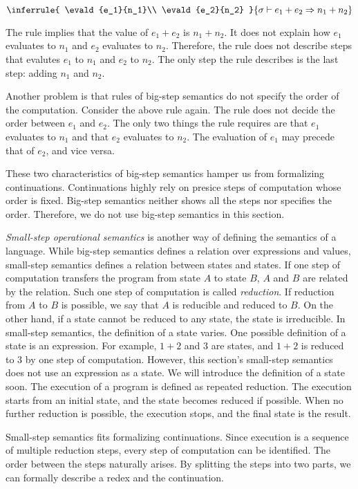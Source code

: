 \[
  \inferrule
  { \evald{e_1}{n_1}\\
    \evald{e_2}{n_2} }
  { \evald{e_1+e_2}{n_1+n_2} }
\]

The rule implies that the value of $e_1+e_2$ is $n_1+n_2$. It does not explain
how $e_1$ evaluates to $n_1$ and $e_2$ evaluates to $n_2$. Therefore, the rule does
not describe steps that evalutes $e_1$ to $n_1$ and $e_2$ to $n_2$.
The only step the rule describes is the last step: adding $n_1$ and $n_2$.

Another problem is that rules of big-step semantics do not specify
the order of the computation. Consider the above rule again. The rule does not
decide the order between $e_1$ and $e_2$. The only two things the rule requires
are that $e_1$ evaluates to $n_1$ and that $e_2$ evaluates to $n_2$.
The evaluation of $e_1$ may precede that of $e_2$, and vice versa.

These two characteristics of big-step semantics hamper us from formalizing
continuations. Continuations highly rely on presice steps of computation whose
order is fixed. Big-step semantics neither shows all the steps nor specifies the
order. Therefore, we do not use big-step semantics in this section.

\textit{Small-step operational semantics}
is another way of defining the semantics of a language. While big-step semantics
defines a relation over expressions and values, small-step semantics
defines a relation between states and states.
If one step of computation transfers the program from state $A$ to state $B$,
$A$ and $B$ are related by the relation. Such one step of computation is called
\textit{reduction}. If reduction from $A$ to $B$ is possible,
we say that $A$ is reducible and reduced to $B$. On the other
hand, if a state cannot be reduced to any state, the state is irreducible.
In small-step semantics, the definition
of a state varies. One possible definition of a state is an expression.
For example, $1+2$ and $3$ are states, and $1+2$ is reduced to $3$ by one step
of computation. However, this section's small-step semantics does not use an
expression as a state. We will introduce the definition of a state soon.
The execution of a program is defined as repeated reduction. The execution
starts from an initial state, and the state becomes reduced if possible. When
no further reduction is possible, the execution stops, and the final state is
the result.

Small-step semantics fits formalizing continuations. Since execution is a
sequence of multiple reduction steps, every step of computation can be
identified. The order between the steps naturally arises. By splitting the steps
into two parts, we can formally describe a redex and the continuation.


